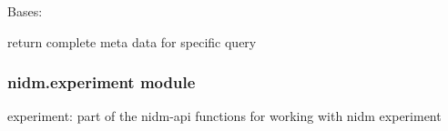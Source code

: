 \documentclass[letterpaper,10pt,english]{sphinxmanual}
\begin{document}
\begin{fulllineitems}
\label{nidm:nidm.app.apiQueryMeta}
Bases: 

return complete meta data for specific query

\begin{fulllineitems}
\label{nidm:nidm.app.apiQueryMeta.endpoint}
\end{fulllineitems}


\begin{fulllineitems}
\label{nidm:nidm.app.apiQueryMeta.get}
\end{fulllineitems}


\begin{fulllineitems}
\label{nidm:nidm.app.apiQueryMeta.mediatypes}
\end{fulllineitems}


\begin{fulllineitems}
\label{nidm:nidm.app.apiQueryMeta.methods}
\end{fulllineitems}


\end{fulllineitems}


\begin{fulllineitems}
\label{nidm:nidm.app.start}
\end{fulllineitems}



\subsubsection{nidm.experiment module}
\label{nidm:module-nidm.experiment}\label{nidm:nidm-experiment-module}
experiment: part of the nidm-api
functions for working with nidm experiment
\end{document}
